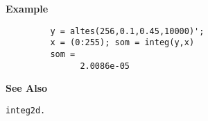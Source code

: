 {\bf \large {}\selectfont Example}
\begin{verbatim}
         y = altes(256,0.1,0.45,10000)'; 
         x = (0:255); som = integ(y,x)
         som = 
               2.0086e-05
\end{verbatim}
\vspace*{.5cm}


{\bf \large {}\selectfont See Also}\\
\hspace*{1.5cm}
\begin{minipage}[t]{13.5cm}
\begin{verbatim}
integ2d.
\end{verbatim}
\end{minipage}



